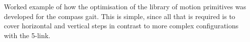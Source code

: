 Worked example of how the optimisation of the library of motion primitives was developed for the compass gait. This is simple, since all that is required is to cover horizontal and vertical steps in contrast to more complex configurations with the 5-link.